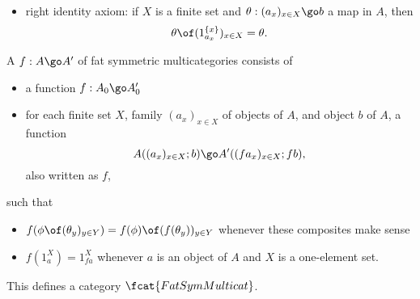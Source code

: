 \begin{defn}
\begin{itemize}
\[\]
\item right identity axiom: if $X$ is a finite set and $\theta: (a_x)_{x\in
X} \go b$ a map in $A$, then 
\[
\theta \of (1_{a_x}^{\{x\}})_{x\in X} = \theta.
\]
\end{itemize}
%
A  $f: A \go A'$ of fat symmetric multicategories consists of
%
\begin{itemize}
\item a function $f: A_0 \go A'_0$ 
\item for each finite set $X$, family $(a_x)_{x\in X}$ of objects of $A$,
and object $b$ of $A$, a function
\[
A( (a_x)_{x\in X}; b )
\go
A'( (fa_x)_{x\in X}; fb ),
\]
also written as $f$,
\end{itemize}
%
such that
%
\begin{itemize}
\item $f(\phi \of (\theta_y)_{y\in Y}) = f(\phi) \of (f(\theta_y))_{y\in Y}$
whenever these composites make sense
\item $f(1_a^X) = 1_{fa}^X$ whenever $a$ is an object of $A$ and $X$ is a
one-element set.   
\end{itemize}
%
This defines a category $\fcat{FatSymMulticat}$.%
% 
% 
\end{defn}


